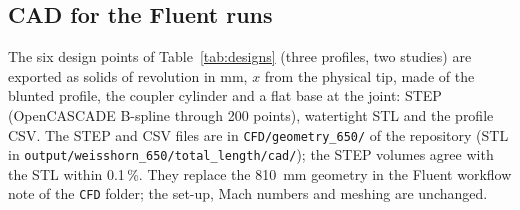 \subsection{CAD for the Fluent runs}

The six design points of Table~\ref{tab:designs} (three profiles, two studies) are exported as
solids of revolution in mm, $x$ from the physical tip, made of the blunted profile, the coupler
cylinder and a flat base at the joint: STEP (OpenCASCADE B-spline through 200 points), watertight
STL and the profile CSV. The STEP and CSV files are in \texttt{CFD/geometry\_650/} of the repository
(STL in \texttt{output/weisshorn\_650/total\_length/cad/}); the STEP volumes agree with the STL
within 0.1\,\%. They replace the \SI{810}{mm} geometry in the Fluent workflow note of the
\texttt{CFD} folder; the set-up, Mach numbers and meshing are unchanged.
